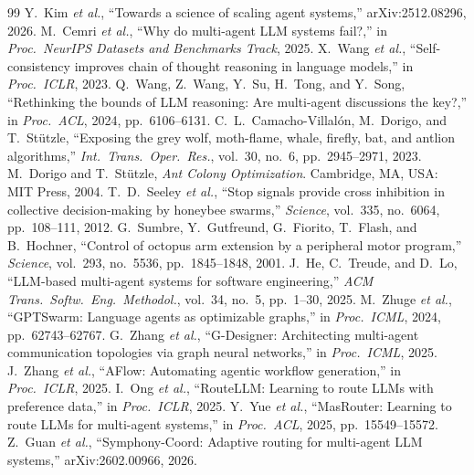 \documentclass[12pt,a4paper]{article}
\begin{document}
{}
\footnotesize
\begin{thebibliography}{99}
\setlength{\itemsep}{0pt}
\sloppy
{} Y.~Kim \emph{et al.}, ``Towards a science of scaling agent systems,'' arXiv:2512.08296, 2026.
 M.~Cemri \emph{et al.}, ``Why do multi-agent LLM systems fail?,'' in \emph{Proc.\ NeurIPS Datasets and Benchmarks Track}, 2025.
 X.~Wang \emph{et al.}, ``Self-consistency improves chain of thought reasoning in language models,'' in \emph{Proc.\ ICLR}, 2023.
 Q.~Wang, Z.~Wang, Y.~Su, H.~Tong, and Y.~Song, ``Rethinking the bounds of LLM reasoning: Are multi-agent discussions the key?,'' in \emph{Proc.\ ACL}, 2024, pp.~6106--6131.
 C.~L.~Camacho-Villal\'on, M.~Dorigo, and T.~St\"utzle, ``Exposing the grey wolf, moth-flame, whale, firefly, bat, and antlion algorithms,'' \emph{Int.\ Trans.\ Oper.\ Res.}, vol.~30, no.~6, pp.~2945--2971, 2023.
 M.~Dorigo and T.~St\"utzle, \emph{Ant Colony Optimization}. Cambridge, MA, USA: MIT Press, 2004.
 T.~D.~Seeley \emph{et al.}, ``Stop signals provide cross inhibition in collective decision-making by honeybee swarms,'' \emph{Science}, vol.~335, no.~6064, pp.~108--111, 2012.
 G.~Sumbre, Y.~Gutfreund, G.~Fiorito, T.~Flash, and B.~Hochner, ``Control of octopus arm extension by a peripheral motor program,'' \emph{Science}, vol.~293, no.~5536, pp.~1845--1848, 2001.
 J.~He, C.~Treude, and D.~Lo, ``LLM-based multi-agent systems for software engineering,'' \emph{ACM Trans.\ Softw.\ Eng.\ Methodol.}, vol.~34, no.~5, pp.~1--30, 2025.
 M.~Zhuge \emph{et al.}, ``GPTSwarm: Language agents as optimizable graphs,'' in \emph{Proc.\ ICML}, 2024, pp.~62743--62767.
 G.~Zhang \emph{et al.}, ``G-Designer: Architecting multi-agent communication topologies via graph neural networks,'' in \emph{Proc.\ ICML}, 2025.
 J.~Zhang \emph{et al.}, ``AFlow: Automating agentic workflow generation,'' in \emph{Proc.\ ICLR}, 2025.
 I.~Ong \emph{et al.}, ``RouteLLM: Learning to route LLMs with preference data,'' in \emph{Proc.\ ICLR}, 2025.
 Y.~Yue \emph{et al.}, ``MasRouter: Learning to route LLMs for multi-agent systems,'' in \emph{Proc.\ ACL}, 2025, pp.~15549--15572.
 Z.~Guan \emph{et al.}, ``Symphony-Coord: Adaptive routing for multi-agent LLM systems,'' arXiv:2602.00966, 2026.

\end{thebibliography}
\end{document}
